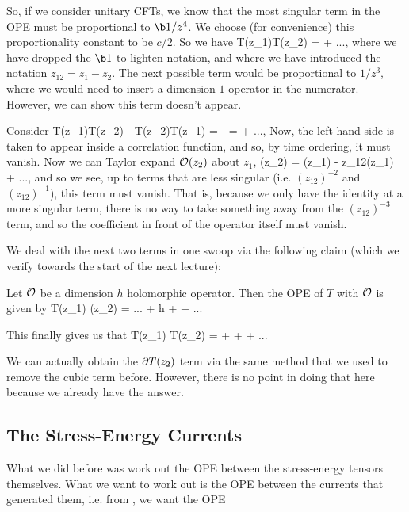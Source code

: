 So, if we consider unitary CFTs, we know that the most singular term in the OPE must be proportional to $\b1/z^4$. We choose (for convenience) this proportionality constant to be $c/2$. So we have 
\bse 
    T(z_1)T(z_2) =  + ...,
\ese 
where we have dropped the $\b1$ to lighten notation, and where we have introduced the notation $z_{12}=z_1-z_2$. The next possible term would be proportional to $1/z^3$, where we would need to insert a dimension $1$ operator in the numerator. However, we can show this term doesn't appear. 

Consider 
\bse 
    T(z_1)T(z_2) - T(z_2)T(z_1) =  -  =  + ...,
\ese 
Now, the left-hand side is taken to appear inside a correlation function, and so, by time ordering, it must vanish. Now we can Taylor expand $\mathcal{O}(z_2)$ about $z_1$, 
\bse 
    \cO(z_2) = \cO(z_1) - z_{12}\p\cO(z_1) + ...,
\ese 
and so we see, up to terms that are less singular (i.e. $(z_{12})^{-2}$ and $(z_{12})^{-1}$), this term must vanish. That is, because we only have the identity at a more singular term, there is no way to take something away from the $(z_{12})^{-3}$ term, and so the coefficient in front of the operator itself must vanish. 

We deal with the next two terms in one swoop via the following claim (which we verify towards the start of the next lecture): 

\bcl
\label{claim:TOTransformation}
    Let $\mathcal{O}$ be a dimension $h$ holomorphic operator. Then the OPE of $T$ with $\mathcal{O}$ is given by 
    \bse 
        T(z_1) \cO(z_2) = ... + h +  + ...
    \ese 
\ecl 


This finally gives us that 
\be 
\label{eqn:TTOPE}
    T(z_1) T(z_2) =  +  +  + ... 
\ee 

\br 
    We can actually obtain the $\partial T(z_2)$ term via the same method that we used to remove the cubic term before. However, there is no point in doing that here because we already have the answer.
\er 

\subsection{The Stress-Energy Currents}

What we did before was work out the OPE between the stress-energy tensors themselves. What we want to work out is the OPE between the currents that generated them, i.e. from , we want the OPE

